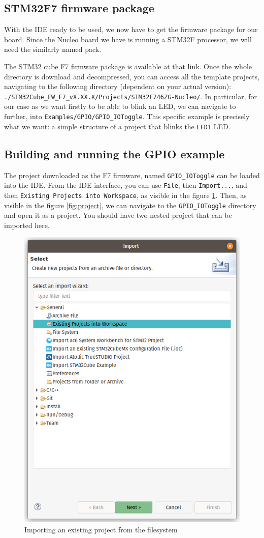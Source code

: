 \documentclass[10pt]{article}
\begin{document}
\subsection{STM32F7 firmware package}
\label{sec:stm32f7-firmw-pack}
With the IDE ready to be used, we now have to get the firmware package for our board.
Since the Nucleo board we have is running a STM32F processor, we will need the similarly named pack.

The \href{https://www.st.com/content/st_com/en/products/embedded-software/mcu-mpu-embedded-software/stm32-embedded-software/stm32cube-mcu-mpu-packages/stm32cubef7.html}{STM32 cube F7 firmware package} is available at that link. Once the whole directory is download and decompressed, you can access all the template projects, navigating to the following directory (dependent on your actual version): \verb|./STM32Cube_FW_F7_vX.XX.X/Projects/STM32F746ZG-Nucleo/|. In particular, for our case as we want firstly to be able to blink an LED, we can navigate to further, into \verb|Examples/GPIO/GPIO_IOToggle|. This specific example is precisely what we want: a simple structure of a project that blinks the \verb|LED1| LED.

\subsection{Building and running the GPIO example}
\label{sec:build-runn-gpio}
The project downloaded as the F7 firmware, named \verb|GPIO_IOToggle| can be loaded into the IDE.
From the IDE interface, you can use \verb|File|, then \verb|Import...|, and then \verb|Existing Projects into Workspace|, as visible in the figure \ref{fig:import}. Then, as visible in the figure \ref{fig:project}, we can navigate to the \verb|GPIO_IOToggle| directory and open it as a project. You should have two nested project that can be imported here.

\begin{figure}[H]
  \centering
  \includegraphics[width=.5\textwidth]{./img/import.png}
  \caption{Importing an existing project from the filesystem}
  \label{fig:import}
\end{figure}
\end{document}

